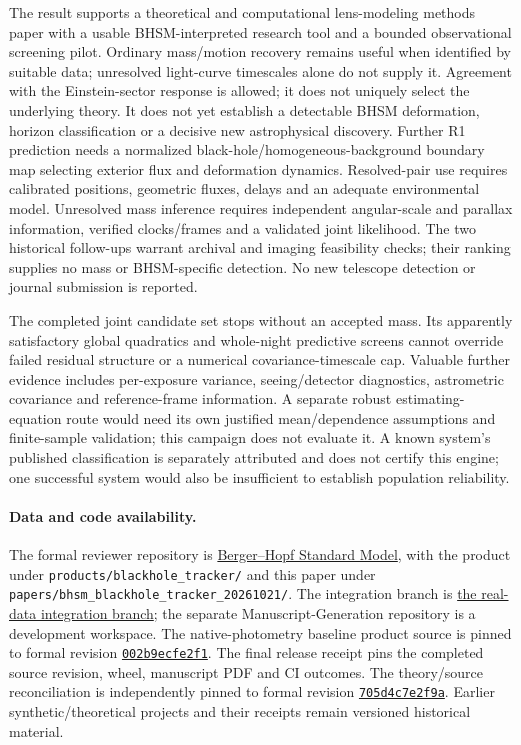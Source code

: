 \documentclass[11pt,a4paper]{article}
\begin{document}
The result supports a theoretical and computational lens-modeling methods
paper with a usable BHSM-interpreted research tool and a bounded
observational screening pilot. Ordinary mass/motion recovery remains
useful when identified by suitable data; unresolved light-curve
timescales alone do not supply it. Agreement with the Einstein-sector
response is allowed; it does not uniquely select the underlying theory. It does not yet establish
a detectable BHSM deformation, horizon classification or a decisive new
astrophysical discovery. Further R1 prediction needs a normalized
black-hole/homogeneous-background boundary map selecting exterior flux
and deformation dynamics. Resolved-pair use requires calibrated
positions, geometric fluxes, delays and an adequate environmental model.
Unresolved mass inference requires independent angular-scale and
parallax information, verified clocks/frames and a validated joint
likelihood. The two historical follow-ups warrant archival and imaging
feasibility checks; their ranking supplies no mass or BHSM-specific
detection. No new telescope detection or journal submission is reported.

The completed joint candidate set stops without an accepted mass. Its apparently
satisfactory global quadratics and whole-night predictive screens cannot override
failed residual structure or a numerical covariance-timescale cap. Valuable
further evidence includes per-exposure variance, seeing/detector diagnostics,
astrometric covariance and reference-frame information. A separate robust
estimating-equation route would need its own justified mean/dependence assumptions
and finite-sample validation; this campaign does not evaluate it. A known system's published classification
is separately attributed and does not certify this engine; one successful system
would also be insufficient to establish population reliability.

\paragraph{Data and code availability.}
The formal reviewer repository is
\href{https://github.com/ncarberry64/Berger-Hopf-Standard-Model}{Berger--Hopf Standard Model},
with the product under \nolinkurl{products/blackhole_tracker/} and this
paper under \nolinkurl{papers/bhsm_blackhole_tracker_20261021/}.
The integration branch is
\href{https://github.com/ncarberry64/Berger-Hopf-Standard-Model/tree/codex/blackhole-tracker-real-data-20261022}{the real-data integration branch};
the separate Manuscript-Generation repository is a development workspace.
The native-photometry baseline product source is pinned to formal revision
\href{https://github.com/ncarberry64/Berger-Hopf-Standard-Model/tree/002b9ecfe2f1a778b68b7558581997c05919ae93/products/blackhole_tracker}{\texttt{002b9ecfe2f1}}.
The final release receipt pins the completed source revision, wheel,
manuscript PDF and CI outcomes. The theory/source reconciliation is
independently pinned to formal revision
\href{https://github.com/ncarberry64/Berger-Hopf-Standard-Model/tree/705d4c7e2f9a832b457f63ff975e7d4dc8008645}{\texttt{705d4c7e2f9a}}.
Earlier synthetic/theoretical projects and their receipts remain
versioned historical material.
\end{document}
